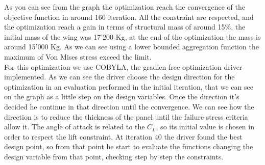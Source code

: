 As you can see from the graph the optimization reach the convergence of the objective function in around 160 iteration. All the constraint are respected, and the optimization reach a gain in terms of structural mass of around 15\%, the initial mass of the wing was 17'200 Kg, at the end of the optimization the mass is around 15'000 Kg. As we can see using a lower bounded aggregation function the maximum of Von Mises stress exceed the limit. \\
For this optimization we use COBYLA, the gradien free optimization driver implemented. As we can see the driver choose the design direction for the optimization in an evaluation performed in the initial iteration, that we can see on the graph as a little step on the design variables. Once the direction it's decided he continue in that direction until the convergence. We can see how the direction is to reduce the thickness of the panel until the failure stress criteria allow it. The angle of attack is related to the $C_L$, so its initial value is chosen in order to respect the lift constraint. At iteration 40 the driver found the best design point, so from that point he start to evaluate the functions changing the design variable from that point, checking step by step the constraints.
